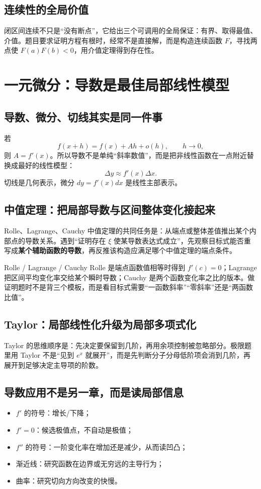 \documentclass[11pt,a4paper,openany]{ctexbook}
\newcommand{\key}[1]{\textbf{\color{deep}#1}}\newcommand{\eng}[1]{\textit{#1}}\let\cleardoublepage\clearpage
\begin{document}
\section{连续性的全局价值}
闭区间连续不只是“没有断点”，它给出三个可调用的全局保证：有界、取得最值、介值。题目要求证明方程有根时，经常不是直接解，而是构造连续函数 $F$，寻找两点使 $F(a)F(b)<0$，用介值定理得到存在性。

\chapter{一元微分：导数是最佳局部线性模型}
\section{导数、微分、切线其实是同一件事}
若
\[
f(x+h)=f(x)+Ah+o(h),\qquad h\to0,
\]
则 $A=f'(x)$。所以导数不是单纯“斜率数值”，而是把非线性函数在一点附近替换成最好的线性模型：
\[
\Delta y\approx f'(x)\Delta x.
\]
切线是几何表示，微分 $dy=f'(x)dx$ 是线性主部表示。

\section{中值定理：把局部导数与区间整体变化接起来}
Rolle、Lagrange、Cauchy 中值定理的共同任务是：从端点或整体差值推出某个内部点的导数关系。遇到“证明存在 $\xi$ 使某导数表达式成立”，先观察目标式能否重写成\key{某个辅助函数的导数}，再反推该构造应满足哪个中值定理的端点条件。
\begin{boundarybox}{Rolle / Lagrange / Cauchy}
Rolle 是端点函数值相等时得到 $f'(c)=0$；Lagrange 把区间平均变化率交给某个瞬时导数；Cauchy 是两个函数变化率之比的版本。做证明题时不是背三个模板，而是看目标式需要“一函数斜率”“零斜率”还是“两函数比值”。
\end{boundarybox}

\section{Taylor：局部线性化升级为局部多项式化}
Taylor 的思维顺序是：先决定要保留到几阶，再用余项控制被忽略部分。极限题里用 Taylor 不是“见到 $e^x$ 就展开”，而是先判断分子分母低阶项会消到几阶，再展开到足够决定主导项的阶数。

\section{导数应用不是另一章，而是读局部信息}
\begin{itemize}
\item $f'$ 的符号：增长/下降；
\item $f'=0$：候选极值点，不自动是极值；
\item $f''$ 的符号：一阶变化率在增加还是减少，从而读凹凸；
\item 渐近线：研究函数在边界或无穷远的主导行为；
\item 曲率：研究切向方向改变的快慢。
\end{itemize}
\end{document}

